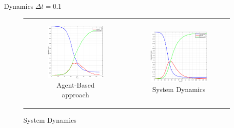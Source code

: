 \documentclass{beamer}
\begin{document}
\begin{frame}{Dynamics $\Delta t = 0.1$}
\begin{figure}
\begin{center}
	\begin{tabular}{c c}
		\begin{subfigure}[b]{0.4\textwidth}
			\centering
			\includegraphics[width=0.95\textwidth, angle=0]{./fig/SIR_Yampa_dt01.png}
			\caption{Agent-Based approach}
		\end{subfigure}
    	
    	&
  
		\begin{subfigure}[b]{0.4\textwidth}
			\centering
			\includegraphics[width=1\textwidth, angle=0]{./fig/SIR_SD_001dt.png}
			\caption{System Dynamics}
		\end{subfigure}
	\end{tabular}
\end{center}
\end{figure}
\end{frame}
\end{document}

